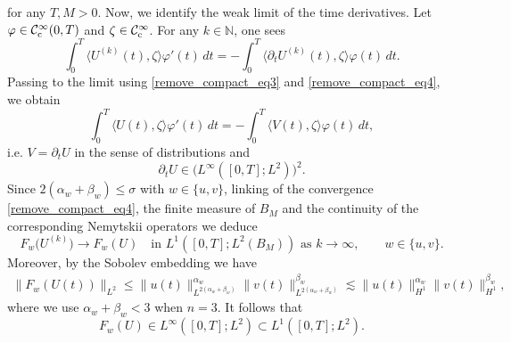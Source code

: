 \documentclass[11pt,reqno]{amsart}
\newcommand{\ity}{\infty}
\begin{document}
	for any $T,M>0$. Now, we identify the weak limit of the time derivatives. Let $\varphi\in \mathcal{C}^\infty_{\rm c}(0,T)$ and $\zeta\in \mathcal{C}^\infty_{\rm c}$. For any $k\in\mathbb N$, one sees
	\[
	\int_0^T\langle U^{(k)}(t),\zeta\rangle\varphi'(t)\,dt=-\int_0^T\langle\partial_tU^{(k)}(t),\zeta\rangle\varphi(t)\,dt.
	\]
	Passing to the limit using \eqref{remove_compact_eq3} and \eqref{remove_compact_eq4}, we obtain
	\[
	\int_0^T\langle U(t),\zeta\rangle\varphi'(t)\,dt=-\int_0^T\langle V(t),\zeta\rangle\varphi(t)\,dt,
	\]
	i.e. $V=\partial_tU$ in the sense of distributions and
	\[
	\partial_tU\in \bigl(L^\infty([0,T];L^2)\bigr)^2.
	\]
	Since $2(\alpha_w+\beta_w)\leq \sigma$ with $w\in\{u,v\}$, linking of the convergence \eqref{remove_compact_eq4}, the finite measure of $B_M$ and the continuity of the corresponding Nemytskii operators we deduce
	\begin{equation}\label{remove_compact_eq6}
		F_w\big(U^{(k)}\big)\to  F_w(U)\quad\text{in }L^1([0,T];L^2(B_M))\text{ as }k\to \ity,\qquad w\in\{u,v\}.
	\end{equation}
	Moreover, by the Sobolev embedding we have
	\[
	\begin{aligned}
		\|F_w(U(t))\|_{L^2}\leq\|u(t)\|_{L^{2(\alpha_w+\beta_w)}}^{\alpha_w}\|v(t)\|_{L^{2(\alpha_w+\beta_w)}}^{\beta_w}\lesssim\|u(t)\|_{H^1}^{\alpha_w}\|v(t)\|_{H^1}^{\beta_w},
	\end{aligned}
	\]
	where we use $\alpha_w+\beta_w<3$ when $n=3$. It follows that
	\[
	F_w(U)\in L^\infty([0,T];L^2)
	\subset L^1([0,T];L^2).
	\]
	
\end{document}
